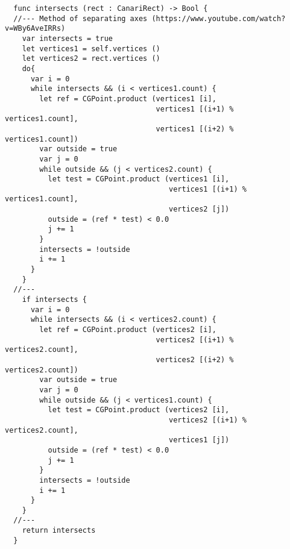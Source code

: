 \begin{lstlisting}
  func intersects (rect : CanariRect) -> Bool {
  //--- Method of separating axes (https://www.youtube.com/watch?v=WBy6AveIRRs)
    var intersects = true
    let vertices1 = self.vertices ()
    let vertices2 = rect.vertices ()
    do{
      var i = 0
      while intersects && (i < vertices1.count) {
        let ref = CGPoint.product (vertices1 [i],
                                   vertices1 [(i+1) % vertices1.count],
                                   vertices1 [(i+2) % vertices1.count])
        var outside = true
        var j = 0
        while outside && (j < vertices2.count) {
          let test = CGPoint.product (vertices1 [i],
                                      vertices1 [(i+1) % vertices1.count],
                                      vertices2 [j])
          outside = (ref * test) < 0.0
          j += 1
        }
        intersects = !outside
        i += 1
      }
    }
  //---
    if intersects {
      var i = 0
      while intersects && (i < vertices2.count) {
        let ref = CGPoint.product (vertices2 [i],
                                   vertices2 [(i+1) % vertices2.count],
                                   vertices2 [(i+2) % vertices2.count])
        var outside = true
        var j = 0
        while outside && (j < vertices1.count) {
          let test = CGPoint.product (vertices2 [i],
                                      vertices2 [(i+1) % vertices2.count],
                                      vertices1 [j])
          outside = (ref * test) < 0.0
          j += 1
        }
        intersects = !outside
        i += 1
      }
    }
  //---
    return intersects
  }
\end{lstlisting}

